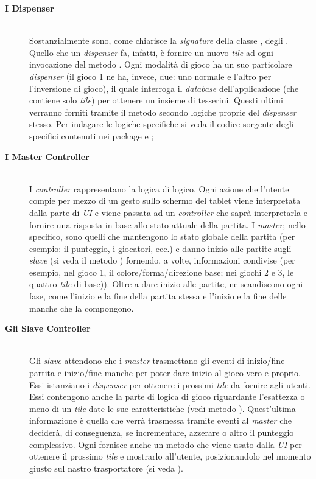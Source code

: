 \begin{description}
\item[\textbf{I Dispenser}]\hfill\\
    Sostanzialmente sono, come chiarisce la \textit{signature} della classe , degli . Quello che un \textit{dispenser} fa, infatti, è fornire un nuovo \textit{tile} ad ogni invocazione del metodo . Ogni modalità di gioco ha un suo particolare \textit{dispenser} (il gioco 1 ne ha, invece, due: uno normale e l'altro per l'inversione di gioco), il quale interroga il \textit{database} dell'applicazione (che contiene solo \textit{tile}) per ottenere un insieme di tesserini. Questi ultimi verranno forniti tramite il metodo  secondo logiche proprie del \textit{dispenser} stesso. Per indagare le logiche specifiche si veda il codice sorgente degli specifici  contenuti nei package  e ;
\item[\textbf{I Master Controller}]\hfill\\
    I \textit{controller} rappresentano la logica di logico. Ogni azione che l'utente compie per mezzo di un gesto sullo schermo del tablet viene interpretata dalla parte di \textit{UI} e viene passata ad un \textit{controller} che saprà interpretarla e fornire una risposta in base allo stato attuale della partita. I \textit{master}, nello specifico, sono quelli che mantengono lo stato globale della partita (per esempio: il punteggio, i giocatori, ecc.) e danno inizio alle partite sugli \textit{slave} (si veda il metodo ) fornendo, a volte, informazioni condivise (per esempio, nel gioco 1, il colore/forma/direzione base; nei giochi 2 e 3, le quattro \textit{tile} di base)). Oltre a dare inizio alle partite, ne scandiscono ogni fase, come l'inizio e la fine della partita stessa e l'inizio e la fine delle manche che la compongono.
\item[\textbf{Gli Slave Controller}]\hfill\\
    Gli \textit{slave} attendono che i \textit{master} trasmettano gli eventi di inizio/fine partita e inizio/fine manche per poter dare inizio al gioco vero e proprio. Essi istanziano i \textit{dispenser} per ottenere i prossimi \textit{tile} da fornire agli utenti. Essi contengono anche la parte di logica di gioco riguardante l'esattezza o meno di un \textit{tile} date le sue caratteristiche (vedi metodo ). Quest'ultima informazione è quella che verrà trasmessa tramite eventi al \textit{master} che deciderà, di conseguenza, se incrementare, azzerare o altro il punteggio complessivo. Ogni  fornisce anche un metodo  che viene usato dalla \textit{UI} per ottenere il prossimo \textit{tile} e mostrarlo all'utente, posizionandolo nel momento giusto sul nastro trasportatore (si veda ).
\end{description}

